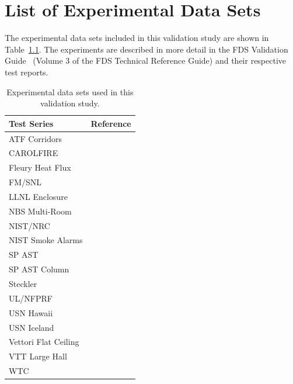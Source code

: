 \documentclass[11pt]{book}
\begin{document}
\chapter{List of Experimental Data Sets}

The experimental data sets included in this validation study are shown in Table~\ref{tab:exp_data_sets}. The experiments are described in more detail in the FDS Validation Guide~\cite{FDS_Validation_Guide} (Volume 3 of the FDS Technical Reference Guide) and their respective test reports.

\begin{table}[!ht]
\caption[Experimental data sets used in this validation study]
{Experimental data sets used in this validation study.}

\begin{center}
\begin{tabular}{|l|c|}
\hline
Test Series           &  Reference                                  \\ \hline \hline
ATF Corridors         &  \cite{Sheppard:Corridors}                  \\ \hline
CAROLFIRE             &  \cite{CAROLFIRE}                           \\ \hline
Fleury Heat Flux      &  \cite{Fleury:Masters}                      \\ \hline
FM/SNL                &  \cite{Nowlen:NUREG4681, Nowlen:NUREG4527}  \\ \hline
LLNL Enclosure        &  \cite{Foote:LLNL1986}                      \\ \hline
NBS Multi-Room        &  \cite{Peacock:NBS_Multi-Room}              \\ \hline
NIST/NRC              &  \cite{Hamins:SP1013-1}                     \\ \hline
NIST Smoke Alarms     &  \cite{Bukowski:1}                          \\ \hline
SP AST                &  \cite{Wickstrom_AST}                       \\ \hline
SP AST Column         &  \cite{Sjostrom:AST}                        \\ \hline
Steckler              &  \cite{Steckler:NBSIR_82-2520}              \\ \hline
UL/NFPRF              &  \cite{Sheppard:1, McGrattan:5}             \\ \hline
USN Hawaii            &  \cite{Gott:1}                              \\ \hline
USN Iceland           &  \cite{Gott:1}                              \\ \hline
Vettori Flat Ceiling  &  \cite{Vettori:1}                           \\ \hline
VTT Large Hall        &  \cite{Hostikka:VTT2104}                    \\ \hline
WTC                   &  \cite{NIST_NCSTAR_1-5B}                    \\ \hline
\end{tabular}
\end{center}
\label{tab:exp_data_sets}
\end{table}
\end{document}
